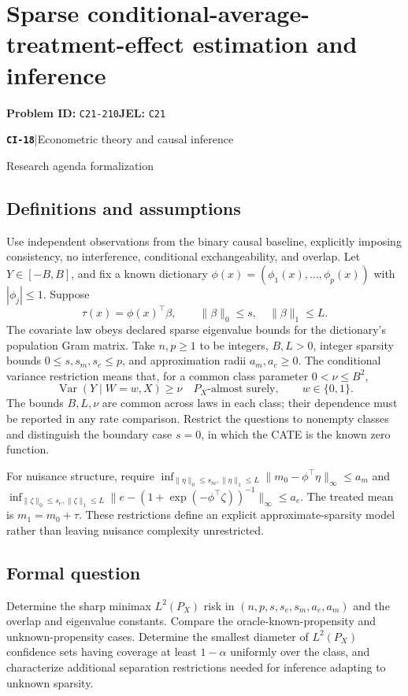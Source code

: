 \documentclass[11pt,a4paper]{article}
\newcommand{\Var}{\operatorname{Var}}
\newcommand{\entrymeta}[3]{{\sffamily\small\color{muted}\textbf{\texttt{#1}}\quad|\quad #2\par #3\par}}
\begin{document}
\section*{Sparse conditional-average-treatment-effect estimation and inference}
\textbf{Problem ID:} \texttt{C21-210}\quad \textbf{JEL:} \texttt{C21}\par
\label{problem:OP-0497}
\label{beyond:CI-18}
\entrymeta{CI-18}{Econometric theory and causal inference}{Research agenda formalization}
\subsection*{Definitions and assumptions}
Use independent observations from the binary causal baseline, explicitly imposing consistency, no interference, conditional exchangeability, and overlap. Let $Y\in[-B,B]$, and fix a known dictionary $\phi(x)=(\phi_1(x),\ldots,\phi_p(x))$ with $|\phi_j|\leq1$. Suppose
\[
\tau(x)=\phi(x)^\top\beta,\qquad
\|\beta\|_0\leq s,\quad\|\beta\|_1\leq L.
\]
The covariate law obeys declared sparse eigenvalue bounds for the dictionary's population Gram matrix. Take $n,p\geq1$ to be integers, $B,L>0$, integer sparsity bounds $0\leq s,s_m,s_e\leq p$, and approximation radii $a_m,a_e\geq0$. The conditional variance restriction means that, for a common class parameter $0<\nu\leq B^2$,
\[
\Var(Y\mid W=w,X)\geq\nu\quad P_X\text{-almost surely},\qquad w\in\{0,1\}.
\]
The bounds $B,L,\nu$ are common across laws in each class; their dependence must be reported in any rate comparison. Restrict the questions to nonempty classes and distinguish the boundary case $s=0$, in which the CATE is the known zero function.

For nuisance structure, require
$\inf_{\|\eta\|_0\leq s_m,\|\eta\|_1\leq L}\|m_0-\phi^\top\eta\|_\infty\leq a_m$
and
$\inf_{\|\zeta\|_0\leq s_e,\|\zeta\|_1\leq L}
\|e-(1+\exp(-\phi^\top\zeta))^{-1}\|_\infty\leq a_e$.
The treated mean is $m_1=m_0+\tau$. These restrictions define an explicit approximate-sparsity model rather than leaving nuisance complexity unrestricted.
\subsection*{Formal question}
Determine the sharp minimax $L^2(P_X)$ risk in $(n,p,s,s_e,s_m,a_e,a_m)$ and the overlap and eigenvalue constants. Compare the oracle-known-propensity and unknown-propensity cases. Determine the smallest diameter of $L^2(P_X)$ confidence sets having coverage at least $1-\alpha$ uniformly over the class, and characterize additional separation restrictions needed for inference adapting to unknown sparsity.
\end{document}
